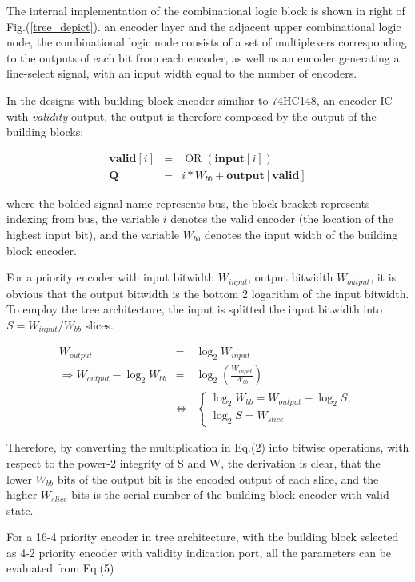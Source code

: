 \documentclass[journal, onecolumn]{IEEEtran}
\begin{document}
The internal implementation of the combinational logic block is shown in right of Fig.(\ref{tree_depict}). an encoder layer and the adjacent upper combinational logic node, the combinational logic node consists of a set of multiplexers corresponding to the outputs of each bit from each encoder, as well as an encoder generating a line-select signal, with an input width equal to the number of encoders.

In the designs with building block encoder similiar to 74HC148, an encoder IC with \textit{validity} output, the output is therefore composed by the output of the building blocks:

\begin{eqnarray}
	\mathbf{valid}[i]&=&\mathop{\mathrm{OR}}(\mathbf{input}[i])\\
	\mathbf{Q}&=&i*W_{bb}+\mathbf{output}[\mathbf{valid}]
\end{eqnarray}

where the bolded signal name represents bus, the block bracket represents indexing from bus, the variable \(i\) denotes the valid encoder (the location of the highest input bit), and the variable \(W_{bb}\) denotes the input width of the building block encoder.

For a priority encoder with input bitwidth \(W_{input}\), output bitwidth \(W_{output}\), it is obvious that the output bitwidth is the bottom 2 logarithm of the input bitwidth. To employ the tree architecture, the input is splitted the input bitwidth into \(S=W_{input}/W_{bb}\) slices.

\begin{eqnarray}
	W_{output}&=& \log_2 W_{input} \\
	\Rightarrow W_{output}-\log_2 W_{bb} &=& \log_2 \left(\frac{W_{input}}{W_{bb}}\right) \\
	&\Leftrightarrow &
	\begin{cases}
		\log_2 W_{bb}=W_{output}-\log_2 S, \\
		\log_2 S=W_{slice}
	\end{cases}
\end{eqnarray}

Therefore, by converting the multiplication in Eq.(2) into bitwise operations, with respect to the power-2 integrity of S and W, the derivation is clear, that the lower \(W_{bb}\) bits of the output bit is the encoded output of each slice, and the higher \(W_{slice}\) bits is the serial number of the building block encoder with valid state.

For a 16-4 priority encoder in tree architecture, with the building block selected as 4-2 priority encoder with validity indication port, all the parameters can be evaluated from Eq.(5)
\end{document}
